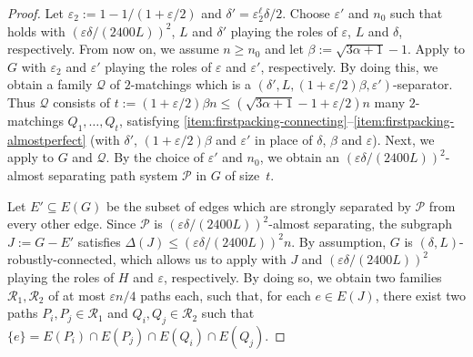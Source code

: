 \documentclass[a4paper, 11pt,reqno]{amsart}
\newcommand{\calQ}{\mathcal{Q}}
\theoremstyle{plain}
\theoremstyle{definition}
\numberwithin{equation}{section}
\newcommand{\eps}{\varepsilon}
\begin{document}
\begin{proof}
  Let $\eps_2 := 1-1/(1 + \eps/2)$ and $\delta' = \eps_2^\ell \delta/2$.  
  Choose $\eps'$ and $n_0$ such that  holds 
  with $(\eps \delta/(2400L))^2$, $L$ and $\delta'$ playing the roles of $\eps$, $L$ and $\delta$,
  respectively. From now on, we assume $n \geq n_0$ and let $\beta := \sqrt{3 \alpha + 1} - 1$.  
  Apply  to $G$ with $\eps_2$ and $\eps'$ playing the roles of $\eps$ and $\eps'$,
  respectively.  By doing this, we obtain a family $\mathcal{Q}$ of $2$-matchings which is 
  a $(\delta', L, (1+\eps/2)\beta, \eps')$-separator.  
  Thus $\mathcal{Q}$ consists of ${t := (1 + \eps/2)\beta n \leq (\sqrt{3 \alpha + 1} - 1 + \eps/2)n}$ 
  many $2$-matchings $Q_1, \dotsc, Q_t$, satisfying 
  \ref{item:firstpacking-connecting}--\ref{item:firstpacking-almostperfect}
  (with $\delta'$, $(1+\eps/2)\beta$ and $\eps'$ in place of $\delta$, $\beta$ and $\eps$).
	Next, we apply  to $G$ and $\mathcal{Q}$.
	By the choice of $\eps'$ and $n_0$, we obtain an $(\eps \delta /(2400L))^2$-almost separating path system $\mathcal{P}$ in $G$ of size~$t$.
	
	Let $E' \subseteq E(G)$ be the subset of edges which are
        strongly separated by $\mathcal{P}$ from every other edge.
        Since $\mathcal{P}$ is $(\eps \delta/(2400L))^2$-almost
        separating, the subgraph $J := G - E'$ satisfies $\Delta(J)
        \leq (\eps \delta/(2400L))^2 n$.  By assumption, $G$ is
        $(\delta, L)$-robustly-connected, which allows us to apply
         with $J$ and $(\eps
        \delta/(2400L))^2$ playing the roles of $H$ and $\eps$,
        respectively.  By doing so, we obtain two families
        $\mathcal{R}_1, \mathcal{R}_2$ of at most $\eps n / 4$ paths
        each, such that, for each $e \in E(J)$, there exist two paths
        $P_i, P_j \in \mathcal{R}_1$ and $ Q_i, Q_j \in \mathcal{R}_2$
        such that $\{e\} = E(P_i) \cap E(P_j) \cap E(Q_i) \cap
        E(Q_j)$.
	

\end{proof}
\end{document}

